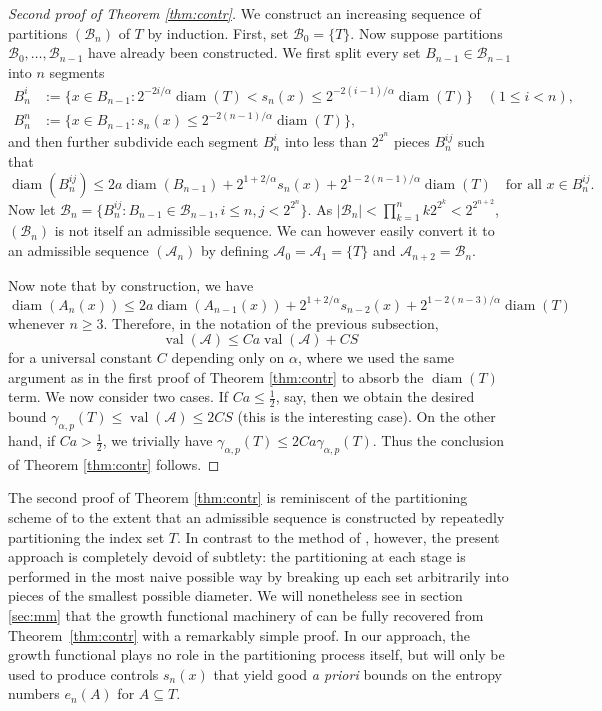 \documentclass[10pt,reqno]{amsart}
\theoremstyle{definition}
\numberwithin{equation}{section}
\numberwithin{figure}{section}
\numberwithin{table}{section}
\newcommand{\diam}{\mathop{\mathrm{diam}}}
\begin{document}
\begin{proof}[Second proof of Theorem \ref{thm:contr}]
We construct an increasing sequence of partitions $(\mathcal{B}_n)$ of $T$ 
by induction. First, set $\mathcal{B}_0=\{T\}$. Now suppose partitions 
$\mathcal{B}_0,\ldots,\mathcal{B}_{n-1}$ have already been constructed. 
We first split every set $B_{n-1}\in\mathcal{B}_{n-1}$ into $n$ 
segments
\begin{align*}
	B_n^i &:= \{x\in B_{n-1}:2^{-2i/\alpha}\diam(T)<s_n(x)\le 
	2^{-2(i-1)/\alpha}\diam(T)\} \quad(1\le i<n),\\
	B_n^n &:= \{x\in B_{n-1}:s_n(x) \le 2^{-2(n-1)/\alpha}\diam(T)\},
\end{align*}
and then further subdivide each segment $B_n^i$ into less than $2^{2^n}$ 
pieces $B_n^{ij}$ such that
$$
	\diam(B_n^{ij}) \le 2a\diam(B_{n-1}) +
	2^{1+2/\alpha}s_n(x) +
	2^{1-2(n-1)/\alpha}\diam(T)
	\quad\mbox{for all }x\in B_n^{ij}.
$$
Now let $\mathcal{B}_n=\{B_n^{ij}:B_{n-1}\in\mathcal{B}_{n-1},i\le 
n,j<2^{2^n}\}$.
As $|\mathcal{B}_n|<\prod_{k=1}^n k2^{2^k}<2^{2^{n+2}}$, 
$(\mathcal{B}_n)$ is not itself an admissible sequence. We can however 
easily convert it to an admissible sequence $(\mathcal{A}_n)$ by defining
$\mathcal{A}_0=\mathcal{A}_1=\{T\}$ and $\mathcal{A}_{n+2}=\mathcal{B}_n$.

Now note that by construction, we have
$$
	\diam(A_{n}(x)) \le
	2a\diam(A_{n-1}(x)) +
	2^{1+2/\alpha}s_{n-2}(x) + 2^{1-2(n-3)/\alpha}\diam(T)
$$
whenever $n\ge 3$. Therefore, in the notation of the previous subsection,
$$
        \mathop{\mathrm{val}}(\mathcal{A}) \le
	Ca\mathop{\mathrm{val}}(\mathcal{A})+CS
$$
for a universal constant $C$ depending only on $\alpha$, where we used the 
same argument as in the first proof of Theorem \ref{thm:contr} to absorb 
the $\diam(T)$ term. We now consider two cases. If $Ca\le\frac{1}{2}$, 
say, then we obtain the desired bound 
$\gamma_{\alpha,p}(T)\le\mathop{\mathrm{val}}(\mathcal{A})\le 2CS$ (this 
is the interesting case). On the other hand, if $Ca>\frac{1}{2}$, we 
trivially have $\gamma_{\alpha,p}(T)\le 2Ca\gamma_{\alpha,p}(T)$. Thus the 
conclusion of Theorem \ref{thm:contr} follows.
\end{proof}

The second proof of Theorem \ref{thm:contr} is reminiscent of the 
partitioning scheme of \cite{Tal14} to the extent that an admissible 
sequence is constructed by repeatedly partitioning the index set $T$. In 
contrast to the method of \cite{Tal14}, however, the present approach is 
completely devoid of subtlety: the partitioning at each stage is performed 
in the most naive possible way by breaking up each set arbitrarily into 
pieces of the smallest possible diameter. We will nonetheless see in 
section \ref{sec:mm} that the growth functional machinery of 
\cite{Tal14} can be fully recovered from Theorem~\ref{thm:contr} with a 
remarkably simple proof. In our approach, the growth functional plays no 
role in the partitioning process itself, but will only be used to produce 
controls $s_n(x)$ that yield good \emph{a priori} bounds on the entropy 
numbers $e_n(A)$ for $A\subseteq T$.
\end{document}
